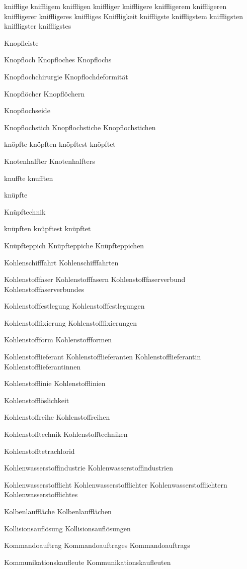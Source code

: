 knifflige
kniffligem
kniffligen
kniffliger
kniffligere
kniffligerem
kniffligeren
kniffligerer
kniffligeres
kniffliges
Kniffligkeit
kniffligste
kniffligstem
kniffligsten
kniffligster
kniffligstes

Knopfleiste

Knopfloch
Knopfloches
Knopflochs

Knopflochchirurgie
Knopflochdeformität

Knopflöcher
Knopflöchern

Knopflochseide

Knopflochstich
Knopflochstiche
Knopflochstichen

knöpfte
knöpften
knöpftest
knöpftet

Knotenhalfter
Knotenhalfters

knuffte
knufften

knüpfte

Knüpftechnik

knüpften
knüpftest
knüpftet

Knüpfteppich
Knüpfteppiche
Knüpfteppichen

Kohlenschifffahrt
Kohlenschifffahrten

Kohlenstofffaser
Kohlenstofffasern
Kohlenstofffaserverbund
Kohlenstofffaserverbundes

Kohlenstofffestlegung
Kohlenstofffestlegungen

Kohlenstofffixierung
Kohlenstofffixierungen

Kohlenstoffform
Kohlenstoffformen

Kohlenstofflieferant
Kohlenstofflieferanten
Kohlenstofflieferantin
Kohlenstofflieferantinnen

Kohlenstofflinie
Kohlenstofflinien

Kohlenstofflöslichkeit

Kohlenstoffreihe
Kohlenstoffreihen

Kohlenstofftechnik
Kohlenstofftechniken

Kohlenstofftetrachlorid

Kohlenwasserstoffindustrie
Kohlenwasserstoffindustrien

Kohlenwasserstofflicht
Kohlenwasserstofflichter
Kohlenwasserstofflichtern
Kohlenwasserstofflichtes

Kolbenlauffläche
Kolbenlaufflächen

Kollisionsauflösung
Kollisionsauflösungen

Kommandoauftrag
Kommandoauftrages
Kommandoauftrags

Kommunikationskaufleute
Kommunikationskaufleuten


